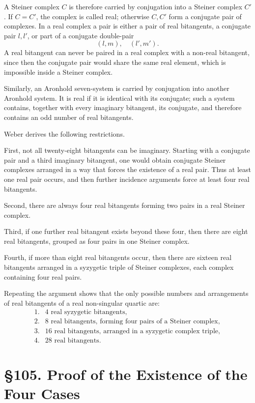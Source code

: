\documentclass[11pt,a4paper]{book}
\newcommand{\webersection}[2]{\clearpage\section*{\S #1. #2}}
\begin{document}
A Steiner complex \(C\) is therefore carried by conjugation into a Steiner complex \(C'\).  If \(C=C'\), the complex is called real; otherwise \(C,C'\) form a conjugate pair of complexes.  In a real complex a pair is either a pair of real bitangents, a conjugate pair \(l,l'\), or part of a conjugate double-pair
\[
(l,m),\quad(l',m').
\]
A real bitangent can never be paired in a real complex with a non-real bitangent, since then the conjugate pair would share the same real element, which is impossible inside a Steiner complex.

Similarly, an Aronhold seven-system is carried by conjugation into another Aronhold system.  It is real if it is identical with its conjugate; such a system contains, together with every imaginary bitangent, its conjugate, and therefore contains an odd number of real bitangents.

Weber derives the following restrictions.

First, not all twenty-eight bitangents can be imaginary.  Starting with a conjugate pair and a third imaginary bitangent, one would obtain conjugate Steiner complexes arranged in a way that forces the existence of a real pair.  Thus at least one real pair occurs, and then further incidence arguments force at least four real bitangents.

Second, there are always four real bitangents forming two pairs in a real Steiner complex.

Third, if one further real bitangent exists beyond these four, then there are eight real bitangents, grouped as four pairs in one Steiner complex.

Fourth, if more than eight real bitangents occur, then there are sixteen real bitangents arranged in a syzygetic triple of Steiner complexes, each complex containing four real pairs.

Repeating the argument shows that the only possible numbers and arrangements of real bitangents of a real non-singular quartic are:
\[
\begin{array}{ll}
1.&4\text{ real syzygetic bitangents},\\
2.&8\text{ real bitangents, forming four pairs of a Steiner complex},\\
3.&16\text{ real bitangents, arranged in a syzygetic complex triple},\\
4.&28\text{ real bitangents}.
\end{array}
\]

\webersection{105}{Proof of the Existence of the Four Cases}
\end{document}
